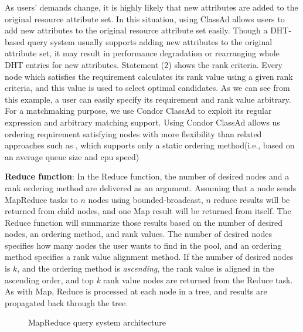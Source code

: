 \documentclass{acm_proc_article-sp}
\begin{document}
As users' demands change, it is highly likely that new attributes are added to the original resource attribute set. 
In this situation, using ClassAd allows users to add new attributes to the original resource attribute set easily.
Though a DHT-based query system usually supports adding new attributes to the original attribute set, it may result in performance degradation or rearranging whole DHT entries for new attributes.
Statement (2) shows the rank criteria. Every node which satisfies the requirement calculates its rank value using a given rank criteria, and this value is used to select optimal candidates.
As we can see from this example, a user can easily specify its requirement and rank value arbitrary.
For a matchmaking purpose, we use Condor ClassAd\cite{classad} to exploit its regular expression and arbitrary matching support.
Using Condor ClassAd allows us ordering requirement satisfying nodes with more flexibility than related approaches such as \cite{can_query}, which supports only a static ordering method(i.e., based on an average queue size and cpu speed)

\textbf{Reduce function}: In the Reduce function, the number of desired nodes and a rank ordering method are delivered as an argument.
Assuming that a node sends MapReduce tasks to $n$ nodes using bounded-broadcast, \begin{math}n\end{math} reduce results will be returned from child nodes, 
and one Map result will be returned from itself. The Reduce function will summarize those results based on the number of desired nodes, an ordering method, and rank values. 
The number of desired nodes specifies how many nodes the user wants to find in the pool, and an ordering method specifies a rank value alignment method. 
If the number of desired nodes is $k$, and the ordering method is \textit{ascending}, the rank value is aligned in the ascending order, and top \textit{k} rank value nodes are returned from the Reduce task.
As with Map, Reduce is processed at each node in a tree, and results are propagated back through the tree.
\begin{figure}
\centering
{}
\caption{\label{fig:mr_arch}MapReduce query system architecture}
\end{figure}
\end{document}
